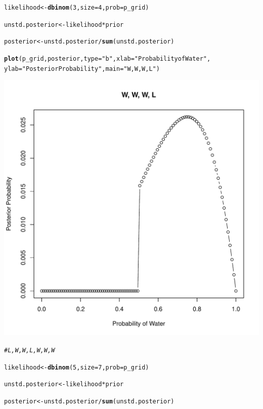 \documentclass[12pt]{article}\usepackage[]{graphicx}\usepackage[]{color}
\makeatletter
\def\maxwidth{ %
  \ifdim\Gin@nat@width>\linewidth
    \linewidth
  \else
    \Gin@nat@width
  \fi
}
\newcommand{\hlnum}[1]{\textcolor[rgb]{0.686,0.059,0.569}{#1}}%
\newcommand{\hlstr}[1]{\textcolor[rgb]{0.192,0.494,0.8}{#1}}%
\newcommand{\hlcom}[1]{\textcolor[rgb]{0.678,0.584,0.686}{\textit{#1}}}%
\newcommand{\hlopt}[1]{\textcolor[rgb]{0,0,0}{#1}}%
\newcommand{\hlstd}[1]{\textcolor[rgb]{0.345,0.345,0.345}{#1}}%
\newcommand{\hlkwb}[1]{\textcolor[rgb]{0.69,0.353,0.396}{#1}}%
\newcommand{\hlkwc}[1]{\textcolor[rgb]{0.333,0.667,0.333}{#1}}%
\newcommand{\hlkwd}[1]{\textcolor[rgb]{0.737,0.353,0.396}{\textbf{#1}}}%
\newenvironment{kframe}{%
 \def\at@end@of@kframe{}%
 \ifinner\ifhmode%
  \def\at@end@of@kframe{\end{minipage}}%
  \begin{minipage}{\columnwidth}%
 \fi\fi%
 \def\FrameCommand##1{\hskip\@totalleftmargin \hskip-\fboxsep
 \colorbox{shadecolor}{##1}\hskip-\fboxsep
     \hskip-\linewidth \hskip-\@totalleftmargin \hskip\columnwidth}%
 \MakeFramed {\advance\hsize-\width
   \@totalleftmargin\z@ \linewidth\hsize
   \@setminipage}}%
 {\par\unskip\endMakeFramed%
 \at@end@of@kframe}
\newenvironment{knitrout}{}{} %
\makeatother
\begin{document}
\begin{knitrout}
\begin{kframe}
\begin{alltt}
\hlstd{likelihood} \hlkwb{<-} \hlkwd{dbinom}\hlstd{(}\hlnum{3}\hlstd{,} \hlkwc{size} \hlstd{=} \hlnum{4}\hlstd{,} \hlkwc{prob} \hlstd{= p_grid)}

\hlstd{unstd.posterior} \hlkwb{<-} \hlstd{likelihood} \hlopt{*} \hlstd{prior}

\hlstd{posterior} \hlkwb{<-} \hlstd{unstd.posterior}\hlopt{/}\hlkwd{sum}\hlstd{(unstd.posterior)}

\hlkwd{plot}\hlstd{(p_grid, posterior,} \hlkwc{type} \hlstd{=} \hlstr{"b"}\hlstd{,} \hlkwc{xlab} \hlstd{=} \hlstr{"Probability of Water"}\hlstd{,}
     \hlkwc{ylab} \hlstd{=} \hlstr{"Posterior Probability"}\hlstd{,} \hlkwc{main} \hlstd{=} \hlstr{"W, W, W, L"}\hlstd{)}
\end{alltt}
\end{kframe}
\includegraphics[width=\maxwidth]{figure/unnamed-chunk-3-2} 
\begin{kframe}\begin{alltt}
\hlcom{#L, W, W, L, W, W, W}

\hlstd{likelihood} \hlkwb{<-} \hlkwd{dbinom}\hlstd{(}\hlnum{5}\hlstd{,} \hlkwc{size} \hlstd{=} \hlnum{7}\hlstd{,} \hlkwc{prob} \hlstd{= p_grid)}

\hlstd{unstd.posterior} \hlkwb{<-} \hlstd{likelihood} \hlopt{*} \hlstd{prior}

\hlstd{posterior} \hlkwb{<-} \hlstd{unstd.posterior}\hlopt{/}\hlkwd{sum}\hlstd{(unstd.posterior)}


\end{alltt}
\end{kframe}
\end{knitrout}
\end{document}
